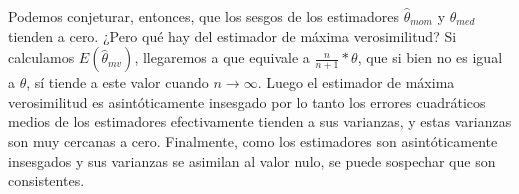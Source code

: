 Podemos conjeturar, entonces, que los sesgos de los estimadores $\hat{\theta}_{mom}$ y $\hat{\theta}_{med}$ tienden a cero. ¿Pero qué hay del estimador de máxima verosimilitud? Si calculamos $E(\hat{\theta}_{mv})$, llegaremos a que equivale a $\frac{n}{n+1} * \theta$, que si bien no es igual a $\theta$, sí tiende a este valor cuando $n \rightarrow \infty$. Luego el estimador de máxima verosimilitud es asintóticamente insesgado por lo tanto los errores cuadráticos medios de los estimadores efectivamente tienden a sus varianzas, y estas varianzas son muy cercanas a cero. Finalmente, como los estimadores son asintóticamente insesgados y sus varianzas se asimilan al valor nulo, se puede sospechar que son consistentes.